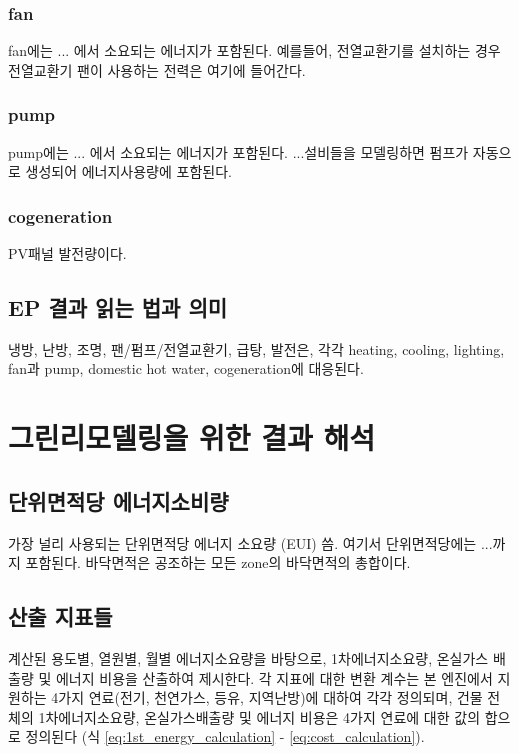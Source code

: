 \subsubsection{fan}
fan에는 ... 에서 소요되는 에너지가 포함된다.
예를들어, 전열교환기를 설치하는 경우 전열교환기 팬이 사용하는 전력은 여기에 들어간다.

\subsubsection{pump}
pump에는 ... 에서 소요되는 에너지가 포함된다. ...설비들을 모델링하면 펌프가 자동으로 생성되어 에너지사용량에 포함된다.

\subsubsection{cogeneration}
PV패널 발전량이다.

\subsection{EP 결과 읽는 법과 의미}
냉방, 난방, 조명, 팬/펌프/전열교환기, 급탕, 발전은,
각각 heating, cooling, lighting, fan과 pump, domestic hot water, cogeneration에 대응된다.


\section{그린리모델링을 위한 결과 해석}

\subsection{단위면적당 에너지소비량} \label{subsec:floorarea_definition_for_EUI}
가장 널리 사용되는 단위면적당 에너지 소요량 (EUI) 씀. 여기서 단위면적당에는 ...까지 포함된다. 바닥면적은 공조하는 모든 zone의 바닥면적의 총합이다.

\subsection{산출 지표들} \label{subsec:result_converting_coeff_definition}
\simulator\은 계산된 용도별, 열원별, 월별 에너지소요량을 바탕으로, 1차에너지소요량, 온실가스 배출량 및 에너지 비용을 산출하여 제시한다. 각 지표에 대한 변환 계수는 본 엔진에서 지원하는 4가지 연료(전기, 천연가스, 등유, 지역난방)에 대하여 각각 정의되며, 건물 전체의 1차에너지소요량, 온실가스배출량 및 에너지 비용은 4가지 연료에 대한 값의 합으로 정의된다 (식 \ref{eq:1st_energy_calculation} - \ref{eq:cost_calculation}).

